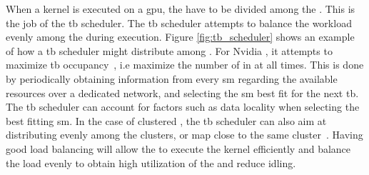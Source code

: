 When a kernel is executed on a \acrshort{gpu}, the  have to be divided among the . This is the job of the \acrshort{tb} scheduler. The \acrshort{tb} scheduler attempts to balance the workload evenly among the  during execution. Figure \ref{fig:tb_scheduler} shows an example of how a \acrshort{tb} scheduler might distribute  among . For Nvidia , it attempts to maximize \acrshort{tb} occupancy~\cite{CTA_scheduling}, i.e maximize the number of  in  at all times. This is done by periodically obtaining information from every \acrshort{sm} regarding the available resources over a dedicated network, and selecting the \acrshort{sm} best fit for the next \acrshort{tb}. The \acrshort{tb} scheduler can account for factors such as data locality when selecting the best fitting \acrshort{sm}. In the case of clustered , the \acrshort{tb} scheduler can also aim at distributing  evenly among the clusters, or map close  to the same cluster~\cite{wang2020modeling}. Having good load balancing will allow the  to execute the kernel efficiently and balance the load evenly to obtain high utilization of the  and reduce idling.




